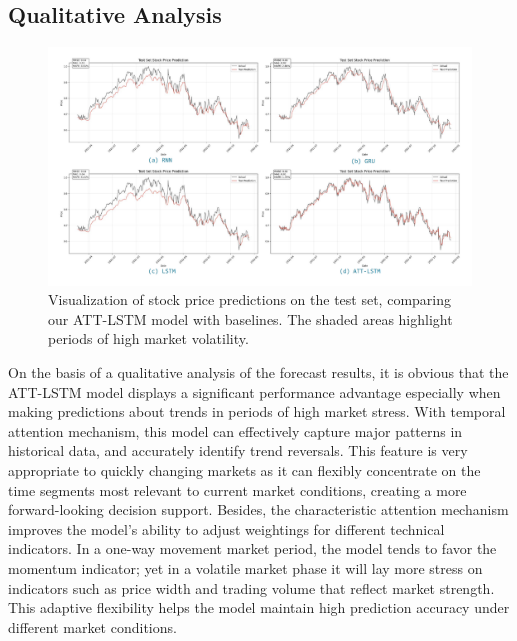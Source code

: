 \documentclass[10pt,twocolumn,letterpaper]{article}
\begin{document}
\subsection{Qualitative Analysis}
\begin{figure}[H]
	\centering
	\includegraphics[width=\linewidth]{result.pdf}
	\caption{Visualization of stock price predictions on the test set, comparing our ATT-LSTM model with baselines. The shaded areas highlight periods of high market volatility.}
	\label{fig:predictions}
\end{figure}
On the basis of a qualitative analysis of the forecast results, it is obvious that the ATT-LSTM model displays a significant performance advantage especially when making predictions about trends in periods of high market stress. With temporal attention mechanism, this model can effectively capture major patterns in historical data, and accurately identify trend reversals. This feature is very appropriate to quickly changing markets as it can flexibly concentrate on the time segments most relevant to current market conditions, creating a more forward-looking decision support. Besides, the characteristic attention mechanism improves the model's ability to adjust weightings for different technical indicators. In a one-way movement market period, the model tends to favor the momentum indicator; yet in a volatile market phase it will lay more stress on indicators such as price width and trading volume that reflect market strength. This adaptive flexibility helps the model maintain high prediction accuracy under different market conditions.
\end{document}
